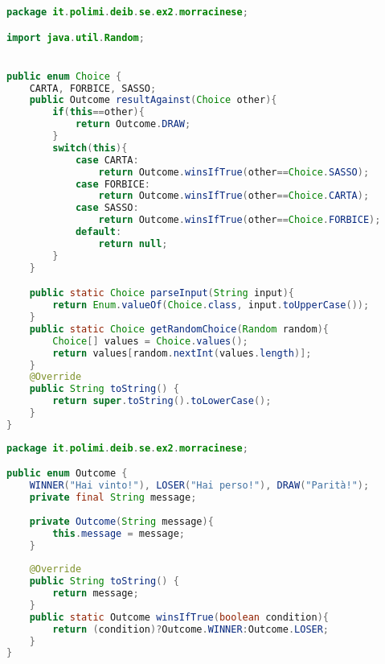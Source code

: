 \documentclass{article}
\begin{document}
\begin{lstlisting}[language=Java,escapechar=|]
package it.polimi.deib.se.ex2.morracinese;

import java.util.Random;


public enum Choice {
    CARTA, FORBICE, SASSO;
    public Outcome resultAgainst(Choice other){
        if(this==other){
            return Outcome.DRAW;
        }
        switch(this){
            case CARTA:
                return Outcome.winsIfTrue(other==Choice.SASSO);		
            case FORBICE:
                return Outcome.winsIfTrue(other==Choice.CARTA);		
            case SASSO:
                return Outcome.winsIfTrue(other==Choice.FORBICE);	
            default:
                return null;
        }		
    }

    public static Choice parseInput(String input){
        return Enum.valueOf(Choice.class, input.toUpperCase());
    }
    public static Choice getRandomChoice(Random random){
        Choice[] values = Choice.values();
        return values[random.nextInt(values.length)];
    }
    @Override
    public String toString() {
        return super.toString().toLowerCase();
    }
}
\end{lstlisting}
\begin{lstlisting}[language=Java,escapechar=|]
package it.polimi.deib.se.ex2.morracinese;

public enum Outcome {
    WINNER("Hai vinto!"), LOSER("Hai perso!"), DRAW("Parità!");
    private final String message;
    
    private Outcome(String message){
        this.message = message;
    }
    
    @Override
    public String toString() {
        return message;
    }
    public static Outcome winsIfTrue(boolean condition){
        return (condition)?Outcome.WINNER:Outcome.LOSER;
    }
}
\end{lstlisting}
\end{document}
